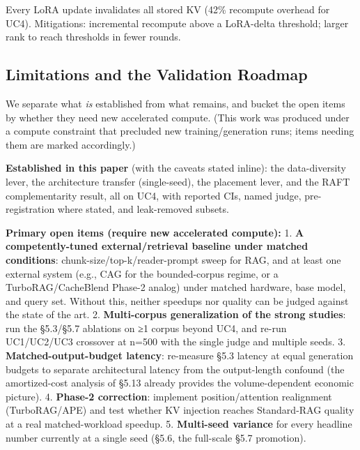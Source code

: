 Every LoRA update invalidates all stored KV (42\% recompute overhead for UC4). Mitigations: incremental recompute above a LoRA-delta threshold; larger rank to reach thresholds in fewer rounds.

\hypertarget{limitations-and-the-validation-roadmap}{%
\subsection{Limitations and the Validation Roadmap}\label{limitations-and-the-validation-roadmap}}

We separate what \emph{is} established from what remains, and bucket the open items by whether they need new accelerated compute. (This work was produced under a compute constraint that precluded new training/generation runs; items needing them are marked accordingly.)

\textbf{Established in this paper} (with the caveats stated inline): the data-diversity lever, the architecture transfer (single-seed), the placement lever, and the RAFT complementarity result, all on UC4, with reported CIs, named judge, pre-registration where stated, and leak-removed subsets.

\textbf{Primary open items (require new accelerated compute):}
1. \textbf{A competently-tuned external/retrieval baseline under matched conditions}: chunk-size/top-k/reader-prompt sweep for RAG, and at least one external system (e.g., CAG for the bounded-corpus regime, or a TurboRAG/CacheBlend Phase-2 analog) under matched hardware, base model, and query set. Without this, neither speedups nor quality can be judged against the state of the art.
2. \textbf{Multi-corpus generalization of the strong studies}: run the §5.3/§5.7 ablations on ≥1 corpus beyond UC4, and re-run UC1/UC2/UC3 crossover at n=500 with the single judge and multiple seeds.
3. \textbf{Matched-output-budget latency}: re-measure §5.3 latency at equal generation budgets to separate architectural latency from the output-length confound (the amortized-cost analysis of §5.13 already provides the volume-dependent economic picture).
4. \textbf{Phase-2 correction}: implement position/attention realignment (TurboRAG/APE) and test whether KV injection reaches Standard-RAG quality at a real matched-workload speedup.
5. \textbf{Multi-seed variance} for every headline number currently at a single seed (§5.6, the full-scale §5.7 promotion).

